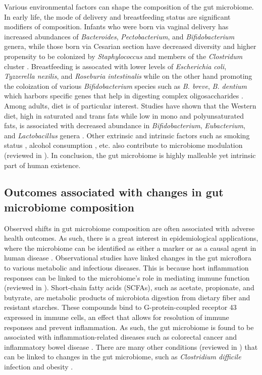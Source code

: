 Various environmental factors can shape the composition of the gut microbiome. In early life, the mode of delivery and breastfeeding status are significant modifiers of composition. Infants who were born via vaginal delivery has increased abundances of \emph{Bacteroides}, \emph{Pectobacterium}, and \emph{Bifidobacterium} genera, while those born via Cesarian section have decreased diversity and higher propensity to be colonized by \emph{Staphylococcus} and members of the \emph{Clostridum} cluster \cite{madan2016effects, kim2020delayed, stewart2018temporal}. Breastfeeding is assocated with lower levels of \emph{Escherichia coli}, \emph{Tyzzerella nexilis}, and \emph{Roseburia intestinalis} while on the other hand promoting the coloization of various \emph{Bifidobacterium} species such as \emph{B. breve}, \emph{B. dentium} which harbors specific genes that help in digesting complex oligosaccharides \cite{stewart2018temporal, vatanen2018human}. Among adults, diet is of particular interest. Studies have shown that the Western diet, high in saturated and trans fats while low in mono and polyunsaturated fats, is associated with decreased abundance in \emph{Bifidobacterium}, \emph{Eubacterium}, and \emph{Lactobacillus} genera \cite{wu2011linking}. Other extrinsic and intrinsic factors such as smoking status \cite{biedermann2013smoking}, alcohol consumption \cite{dubinkina2017links}, etc. also contribute to microbiome modulation (reviewed in \cite{schmidt2018humana}). In conclusion, the gut microbiome is highly malleable yet intrinsic part of human existence. 

\subsection{Outcomes associated with changes in gut microbiome composition}

Observed shifts in gut microbiome composition are often associated with adverse health outcomes. As such, there is a great interest in epidemiological applications, where the microbiome can be identified as either a marker or as a causal agent in human disease \cite{foxman2015use}. Observational studies have linked changes in the gut microflora to various metabolic and infectious diseases. This is because host inflammation responses can be linked to the microbiome's role in mediating immune function (reviewed in \cite{wang2020relationship}). Short-chain fatty acids (SCFAs), such as acetate, propionate, and butyrate, are metabolic products of microbiota digestion from dietary fiber and resistant starches. These compounds bind to G-protein-coupled receptor 43 expressed in immune cells, an effect that allows for resolution of immune responses and prevent inflammation. As such, the gut microbiome is found to be associated with inflammation-related diseases such as colorectal cancer \cite{cheng2020intestinal, yu2017metagenomica} and inflammatory bowel disease \cite{gevers2014treatmentnaive, franzosa2019gut, lloyd-price2019multiomics}. There are many other conditions (reviewed in \cite{cho2012human}) that can be linked to changes in the gut microbiome, such as \emph{Clostridium difficile} infection \cite{weingarden2014microbiota} and obesity \cite{turnbaugh2009core, aoun2020influence}.   


